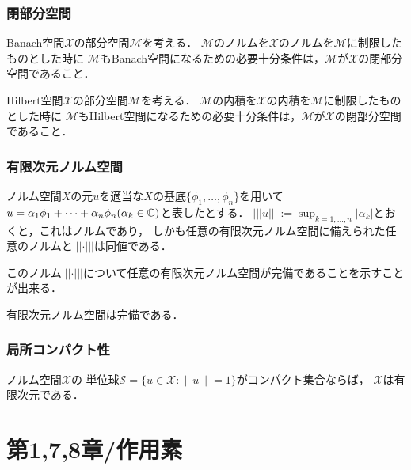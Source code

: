 \documentclass[a4j]{jsarticle}
\newcommand{\spX}{\mathscr{X}}
\begin{document}
    \subsubsection{閉部分空間}
    \begin{Thm}[定理1.28, p17] \label{them1:28}
        Banach空間$\spX$の部分空間$\mathscr{M}$を考える．
        $\mathscr{M}$のノルムを$\spX$のノルムを$\mathscr{M}$に制限したものとした時に
        $\mathscr{M}$もBanach空間になるための必要十分条件は，$\mathscr{M}$が$\spX$の閉部分空間であること．
    \end{Thm}
    \begin{Cor}[系1.29, p.18] \label{cor1:29}
        Hilbert空間$\spX$の部分空間$\mathscr{M}$を考える．
        $\mathscr{M}$の内積を$\spX$の内積を$\mathscr{M}$に制限したものとした時に
        $\mathscr{M}$もHilbert空間になるための必要十分条件は，$\mathscr{M}$が$\spX$の閉部分空間であること．
    \end{Cor}

    \subsubsection{有限次元ノルム空間}
    \begin{Thm}[補題1.38, p.22] \label{them1:38}
        ノルム空間$X$の元$u$を適当な$X$の基底$\{ \phi_1, \dots, \phi_n \}$を用いて
        $u=\alpha_1 \phi_1+\dots+\alpha_n \phi_n (\alpha_k \in \mathbb{C})$と表したとする．
        $||| u |||:=\sup_{k=1,\dots,n}{|\alpha_k|}$とおくと，これはノルムであり，
        しかも任意の有限次元ノルム空間に備えられた任意のノルムと$||| \cdot |||$は同値である．
    \end{Thm}
    このノルム$||| \cdot |||$について任意の有限次元ノルム空間が完備であることを示すことが出来る．
    \begin{Thm}[定理1.37, p.22] \label{them1:37}
        有限次元ノルム空間は完備である．
    \end{Thm}

    \subsubsection{局所コンパクト性}
    \begin{Thm}
        ノルム空間$\spX$の
        単位球$\mathcal{S}=\{u \in \spX : \|u\|=1\}$がコンパクト集合ならば，
        $\spX$は有限次元である．
    \end{Thm}

    \section{第1,7,8章/作用素}
\end{document}
